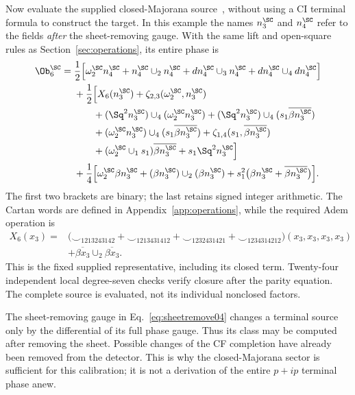 Now evaluate the supplied closed-Majorana source~\cite[Sec.~V~G]{Project4}, without using a CI terminal formula to construct the target. In this example the names $n_3^{\SC}$ and $n_4^{\SC}$ refer to the fields \emph{after} the sheet-removing gauge. With the same lift and open-square rules as Section~\ref{sec:operations}, its entire phase is
\begin{align}\label{eq:closedparityeval04}
\Ob_6^{\SC}={}&\frac12\Big[
 \omega_2^{\SC}n_4^{\SC}+n_4^{\SC}\cup_2n_4^{\SC}
 +dn_4^{\SC}\cup_3n_4^{\SC}+dn_4^{\SC}\cup_4dn_4^{\SC}\Big]\nonumber\\
&+\frac12\Big[X_6(n_3^{\SC})+\zeta_{2,3}(\omega_2^{\SC},n_3^{\SC})\nonumber\\
&\qquad +(\Sq^2n_3^{\SC})\cup_4(\omega_2^{\SC}n_3^{\SC})
 +(\Sq^2n_3^{\SC})\cup_4(s_1\overline{\beta n_3^{\SC}})\nonumber\\
&\qquad +(\omega_2^{\SC}n_3^{\SC})\cup_4(s_1\overline{\beta n_3^{\SC}})
 +\zeta_{1,4}(s_1,\overline{\beta n_3^{\SC}})\nonumber\\
&\qquad +(\omega_2^{\SC}\cup_1s_1)\overline{\beta n_3^{\SC}}
 +s_1\Sq^2n_3^{\SC}\Big]\nonumber\\
&+\frac14\Big[\omega_2^{\SC}\beta n_3^{\SC}
 +(\beta n_3^{\SC})\cup_2(\beta n_3^{\SC})
 +s_1^2\big(\beta n_3^{\SC}+\overline{\beta n_3^{\SC}}\big)\Big].
\end{align}
The first two brackets are binary; the last retains signed integer arithmetic. The Cartan words are defined in Appendix~\ref{app:operations}, while the required Adem operation is
\begin{equation}\label{eq:X6-parity}
\begin{split}
X_6(x_3)={}&
 \big(\smile_{1213243142}+\smile_{1213431412}
      +\smile_{1232431421}+\smile_{1234314212}\big)(x_3,x_3,x_3,x_3)\\
 &+\overline{\beta x_3}\cup_2\overline{\beta x_3}.
\end{split}
\end{equation}
This is the fixed supplied representative, including its closed term. Twenty-four independent local degree-seven checks verify closure after the parity equation. The complete source is evaluated, not its individual nonclosed factors.

The sheet-removing gauge in Eq.~\eqref{eq:sheetremove04} changes a terminal source only by the differential of its full phase gauge. Thus its class may be computed after removing the sheet. Possible changes of the CF completion have already been removed from the detector. This is why the closed-Majorana sector is sufficient for this calibration; it is not a derivation of the entire $p+ip$ terminal phase anew.


